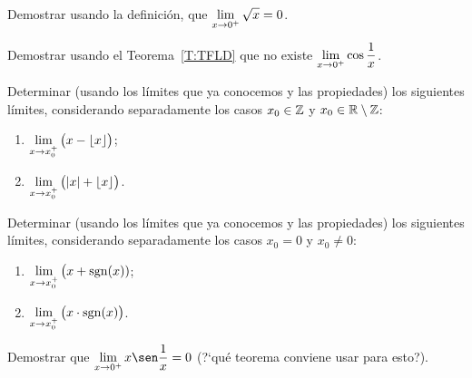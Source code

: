 \item Demostrar usando la definición, que $\displaystyle\lim_{x\to 0^+} \sqrt{x} = 0$.

\item Demostrar usando el Teorema~\ref{T:TFLD} que no existe $\displaystyle\lim_{x\to 0^+}\cos\frac1x$.

\item Determinar (usando los límites que ya conocemos y las propiedades) los siguientes límites, considerando separadamente los casos $x_0\in\mathbb{Z}$ y $x_0\in\mathbb{R}\setminus\mathbb{Z}$:
\begin{multicols}{2}
    \begin{enumerate}
    \item $\displaystyle\lim_{x\to x_0^+} \big(x-\lfloor x \rfloor\big)$;
    \item $\displaystyle\lim_{x\to x_0^+} \big(|x|+\lfloor x \rfloor\big)$.
    \end{enumerate}
\end{multicols}

\item Determinar (usando los límites que ya conocemos y las propiedades) los siguientes límites, considerando separadamente los casos $x_0=0$ y $x_0\neq 0$:
\begin{multicols}{2}
    \begin{enumerate}
    \item $\displaystyle\lim_{x\to x_0^+} \big(x+\operatorname{sgn}(x))$;
    \item $\displaystyle\lim_{x\to x_0^+} \big(x\cdot \operatorname{sgn}(x)\big)$.
    \end{enumerate}
    \end{multicols}

\item Demostrar que $\D\lim_{x\to 0^+} x \sen\frac1x = 0$ (?`qué teorema conviene usar para esto?).
    
